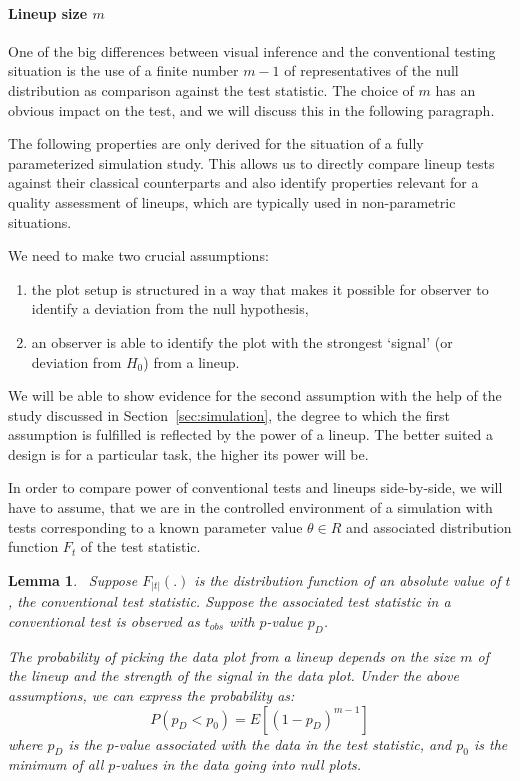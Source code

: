 \documentclass{article}
\newcommand{\red}[1]{{\color{red} #1}}
\newcommand{\hh}[1]{{\color{orange} #1}} %
\newtheorem{lemma}[thm]{Lemma}
\begin{document}

\noindent
\paragraph{Lineup size $m$}
One of the big differences between visual inference and the conventional testing situation is the use of a finite number $m-1$ of representatives of the null distribution as comparison against the test statistic. The choice of $m$ has an obvious impact on the test, and we will discuss this in the following paragraph.

The following properties are only derived for the situation of a  fully parameterized  simulation study. This allows us to directly compare lineup tests against their classical counterparts and also identify  properties relevant for a quality assessment of  lineups, which are typically used  in non-parametric situations.

We need to make two crucial assumptions:
\begin{enumerate} \itemsep 0in
\item  the plot setup is structured in a way that makes it possible for observer to identify a deviation from the null hypothesis,
\item an observer is able to identify the plot with the strongest `signal' (or deviation from $H_0$)  from a lineup.
\end{enumerate}
We will be able to show evidence for the second assumption with the help of the study discussed in Section~\ref{sec:simulation}, \hh{the degree to which the first assumption is fulfilled is reflected} by the power of a lineup. The better suited a design is for a particular task, the higher its power will be.

\hh{In order to compare power of conventional tests and lineups side-by-side, we will have to assume, that we are in the controlled environment of a simulation with tests corresponding to a known parameter value $\theta \in R$ and associated distribution function $F_t$ of the test statistic. }

\begin{lemma}~\label{lemma}
Suppose $F_{|t|}(.)$ is the distribution function of an absolute value of $t$, the conventional test statistic. Suppose the associated test statistic in a conventional test is observed as  $t_{obs}$ with $p$-value $p_D$. 

The probability of picking the data plot from a lineup depends on the size $m$ of the lineup and the strength of the signal in the data plot. 
Under the above assumptions, we can express the probability as:
\[
P(p_D < p_0) =  E\left[ (1 - p_D)^{m-1}\right]
\]
where $p_D$ is the $p$-value associated with the data in the test statistic, and $p_0$ is the minimum of all $p$-values in the data going into null plots.
\end{lemma}
\end{document}
